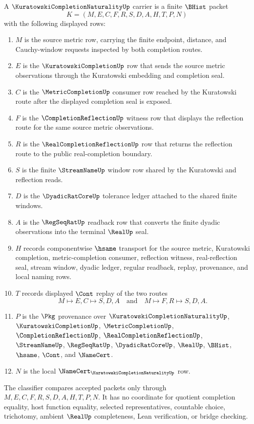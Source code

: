 \begin{definition}
\label{def:kuratowski-completion-naturality-carrier}
A $\KuratowskiCompletionNaturalityUp$ carrier is a finite $\BHist$ packet
$$
K=(M,E,C,F,R,S,D,A,H,T,P,N)
$$
with the following displayed rows:
\begin{enumerate}
\item $M$ is the source metric row, carrying the finite endpoint, distance, and Cauchy-window requests inspected by both completion routes.
\item $E$ is the $\KuratowskiCompletionUp$ row that sends the source metric observations through the Kuratowski embedding and completion seal.
\item $C$ is the $\MetricCompletionUp$ consumer row reached by the Kuratowski route after the displayed completion seal is exposed.
\item $F$ is the $\CompletionReflectionUp$ witness row that displays the reflection route for the same source metric observations.
\item $R$ is the $\RealCompletionReflectionUp$ row that returns the reflection route to the public real-completion boundary.
\item $S$ is the finite $\StreamNameUp$ window row shared by the Kuratowski and reflection reads.
\item $D$ is the $\DyadicRatCoreUp$ tolerance ledger attached to the shared finite windows.
\item $A$ is the $\RegSeqRatUp$ readback row that converts the finite dyadic observations into the terminal $\RealUp$ seal.
\item $H$ records componentwise $\hsame$ transport for the source metric, Kuratowski completion, metric-completion consumer, reflection witness, real-reflection seal, stream window, dyadic ledger, regular readback, replay, provenance, and local naming rows.
\item $T$ records displayed $\Cont$ replay of the two routes
$$
M \longmapsto E,C \longmapsto S,D,A \quad\text{and}\quad M \longmapsto F,R \longmapsto S,D,A .
$$
\item $P$ is the $\Pkg$ provenance over $\KuratowskiCompletionNaturalityUp$, $\KuratowskiCompletionUp$, $\MetricCompletionUp$, $\CompletionReflectionUp$, $\RealCompletionReflectionUp$, $\StreamNameUp$, $\RegSeqRatUp$, $\DyadicRatCoreUp$, $\RealUp$, $\BHist$, $\hsame$, $\Cont$, and $\NameCert$.
\item $N$ is the local $\NameCert_{\KuratowskiCompletionNaturalityUp}$ row.
\end{enumerate}
The classifier compares accepted packets only through $M,E,C,F,R,S,D,A,H,T,P,N$. It has no coordinate for quotient completion equality, host function equality, selected representatives, countable choice, trichotomy, ambient $\RealUp$ completeness, Lean verification, or bridge checking.
\end{definition}

